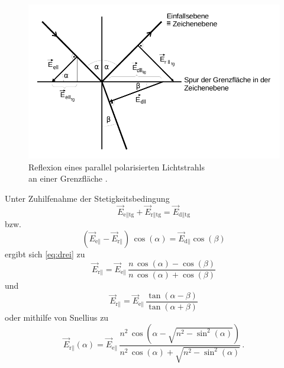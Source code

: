 \begin{figure}[H]
    \centering
    \includegraphics{Brechung mit paralleler Strahlung.pdf}
    \caption{Reflexion eines parallel polarisierten Lichtstrahls \\ an einer Grenzfläche \cite{ap01}.}
    \label{fig:abb3}
\end{figure}

Unter Zuhilfenahme der Stetigkeitsbedingung
\begin{equation*}
    \vec{E}_{\text{e}\parallel \text{tg}} + \vec{E}_{\text{r}\parallel \text{tg}} = \vec{E}_{\text{d}\parallel \text{tg}}
\end{equation*}
bzw.
\begin{equation}
    (\vec{E}_{\text{e}\parallel} - \vec{E}_{\text{r}\parallel}) \, \cos(\alpha) = \vec{E}_{\text{d}\parallel} \cos(\beta)
    \label{eq:stetigkeitsbedEpar}
\end{equation}
ergibt sich \eqref{eq:drei} zu
\begin{equation*}
    \vec{E}_{\text{r}\parallel} = \vec{E}_{\text{e}\parallel} \, \frac{n \, \cos(\alpha) - \cos(\beta)}{n \, \cos(\alpha) + \cos(\beta)}
\end{equation*}
und 
\begin{equation}
    \vec{E}_{\text{r}\parallel} = \vec{E}_{\text{e}\parallel} \, \frac{\tan(\alpha - \beta)}{\tan(\alpha + \beta)}
    \label{eq:E_par}
\end{equation}
oder mithilfe von Snellius zu
\begin{equation}
    \vec{E}_{\text{r}\parallel} (\alpha) = \vec{E}_{\text{e}\parallel} \, \frac{n^2 \, \cos(\alpha - \sqrt{n^2 - \sin^2(\alpha)})}{n^2 \, \cos(\alpha) + \sqrt{n^2 - \sin^2(\alpha)}} \,.
    \label{eq:E_parSnellius}
\end{equation} \\

